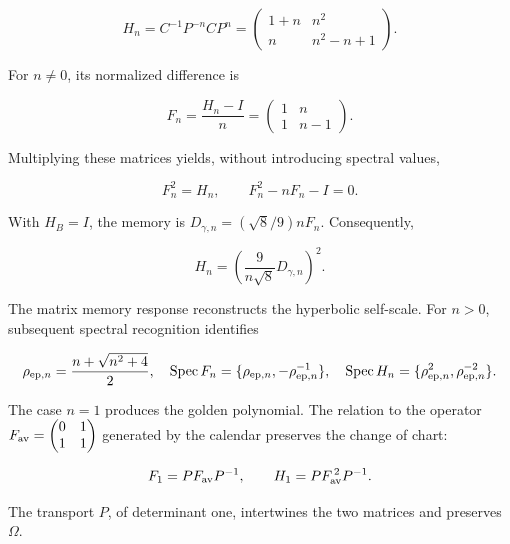 \begin{equation}
H_n=C^{-1}P^{-n}CP^n
=\begin{pmatrix}1+n&n^2\\n&n^2-n+1\end{pmatrix}.
\label{md:antmem:matriz:eq:28}
\end{equation}

For \(n\ne0\), its normalized difference is

\[
F_n=\frac{H_n-I}{n}
=\begin{pmatrix}1&n\\1&n-1\end{pmatrix}.
\]

Multiplying these matrices yields, without introducing spectral values,

\begin{equation}
\boxed{F_n^2=H_n,\qquad F_n^2-nF_n-I=0.}
\label{md:antmem:matriz:eq:29}
\end{equation}

With \(H_B=I\), the memory is
\(D_{\gamma,n}=(\sqrt8/9)nF_n\).
Consequently,

\begin{equation}
\boxed{H_n=\left(\frac9{n\sqrt8}D_{\gamma,n}\right)^2.}
\label{md:antmem:matriz:eq:30}
\end{equation}

The matrix memory response reconstructs the hyperbolic
self-scale. For \(n>0\), subsequent spectral recognition
identifies

\begin{equation}
\rho_{{\rm ep},n}=\frac{n+\sqrt{n^2+4}}2,\quad
\operatorname{Spec}F_n=\{\rho_{{\rm ep},n},-\rho_{{\rm ep},n}^{-1}\},\quad
\operatorname{Spec}H_n=\{\rho_{{\rm ep},n}^2,\rho_{{\rm ep},n}^{-2}\}.
\label{md:antmem:matriz:eq:31}
\end{equation}

The case \(n=1\) produces the golden polynomial.
The relation to the operator
\(F_{\rm av}=\begin{pmatrix}0&1\\1&1\end{pmatrix}\)
generated by the calendar preserves the change
of chart:

\begin{equation}
F_1=PF_{\rm av}P^{-1},\qquad
H_1=PF_{\rm av}^{\,2}P^{-1}.
\label{md:antmem:matriz:eq:32}
\end{equation}

The transport \(P\), of determinant one, intertwines the two
matrices and preserves \(\Omega\).

